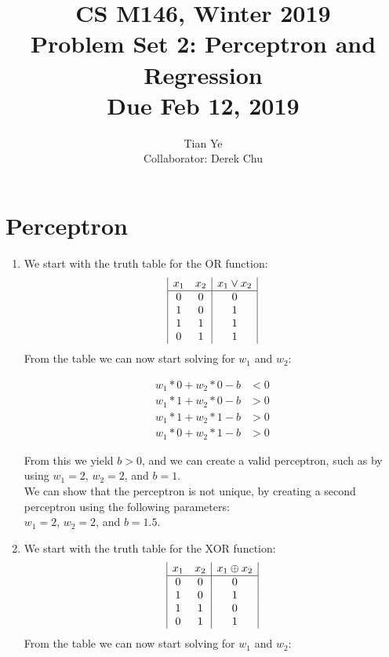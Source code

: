 \documentclass[11pt]{article}
\newcommand{\cnum}{CS M146}
\newcommand{\ced}{Winter 2019}
\newcommand{\ctitle}[3]{\title{\vspace{-0.5in}\cnum, \ced\\Problem Set #1: #2\\Due #3}}
\newcommand{\solution}[1]{{{\color{blue}{\bf Solution:} {#1}}}}
\begin{document}
\ctitle{2}{Perceptron and Regression}{Feb 12, 2019}
\author{Tian Ye \\ \small{Collaborator: Derek Chu}}
\maketitle

\newpage

\section{Perceptron}
\begin{enumerate}
\item 

\solution{
We start with the truth table for the OR function:
\begin{displaymath}
\begin{array}{|c c|c|}
x_1 & x_2 & x_1 \lor x_2\\ 
\hline  
0 & 0 & 0\\
1 & 0 & 1\\
1 & 1 & 1\\
0 & 1 & 1\\
\end{array}
\end{displaymath}
From the table we can now start solving for $w_1$ and $w_2$:

\begin{align}
w_1*0 + w_2*0 - b &< 0 \\
w_1*1 + w_2*0 - b &> 0 \\
w_1*1 + w_2*1 - b &> 0 \\
w_1*0 + w_2*1 - b &> 0
\end{align}

From this we yield $b > 0$, and we can create a valid perceptron, such as by using $w_1 = 2$, $w_2 = 2$, and $b = 1$. \\
We can show that the perceptron is not unique, by creating a second perceptron using the following parameters: \\
$w_1 = 2$, $w_2 = 2$, and $b = 1.5$.
}
\vspace{1cm}

\item
\solution{
We start with the truth table for the XOR function:
\begin{displaymath}
\begin{array}{|c c|c|}
x_1 & x_2 & x_1 \oplus x_2\\ 
\hline  
0 & 0 & 0\\
1 & 0 & 1\\
1 & 1 & 0\\
0 & 1 & 1\\
\end{array}
\end{displaymath}
From the table we can now start solving for $w_1$ and $w_2$:

}
\end{enumerate}
\end{document}
